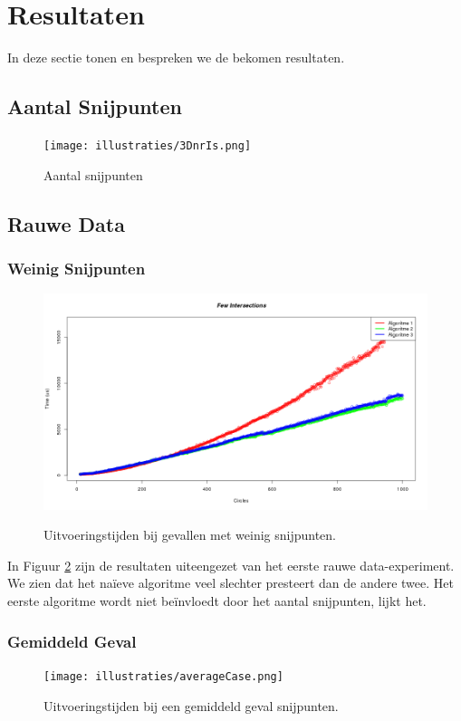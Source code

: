 \newpage
\section{Resultaten}
In deze sectie tonen en bespreken we de bekomen resultaten.

\subsection{Aantal Snijpunten}
\begin{figure}[H]
   	\centering
   	\texttt{[image: illustraties/3DnrIs.png]}
  	\label{fig:nr_intersections}
  	\caption{Aantal snijpunten}
\end{figure}

\subsection{Rauwe Data}
\subsubsection{Weinig Snijpunten}
\begin{figure}[H]
   	\centering
   	\includegraphics[width=\textwidth]{illustraties/fewIntersections.png}
  	\label{fig:few_intersections}
  	\caption{Uitvoeringstijden bij gevallen met weinig snijpunten.}
\end{figure}
In Figuur \ref{fig:few_intersections} zijn de resultaten uiteengezet van het eerste rauwe data-experiment. We zien dat het na\"ieve algoritme veel slechter presteert dan de andere twee. Het eerste algoritme wordt niet be\"invloedt door het aantal snijpunten, lijkt het.

\subsubsection{Gemiddeld Geval}
\begin{figure}[H]
	\centering
   	\texttt{[image: illustraties/averageCase.png]}
  	\label{fig:average_case}
  	\caption{Uitvoeringstijden bij een gemiddeld geval snijpunten.}
\end{figure}
   
